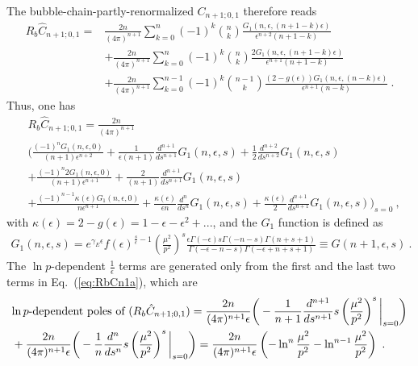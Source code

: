 \documentclass[a4paper,11pt]{article}
\begin{document}
The bubble-chain-partly-renormalized $C_{n+1;0,1}$ therefore reads
\begin{align} \label{eq:RbCn1a}
R_{b}\hat C_{n+1;0,1}=&\frac{2n}{(4\pi)^{n+1}}\sum_{k=0}^n(-1)^k\binom{n}{k}\frac{G_1(n,\epsilon,(n+1-k)\epsilon)}{\epsilon^{n+2}(n+1-k)} \nonumber \\
&+\frac{2n}{(4\pi)^{n+1}}\sum_{k=0}^n(-1)^k\binom{n}{k}\frac{2G_1(n,\epsilon,(n+1-k)\epsilon)}{\epsilon^{n+1}(n+1-k)}\nonumber \\
&+\frac{2n}{(4\pi)^{n+1}}\sum_{k=0}^{n-1}(-1)^k\binom{n-1}{k}\frac{(2-g(\epsilon))G_1(n,\epsilon,(n-k)\epsilon)}{\epsilon^{n+1}(n-k)} \ .
\end{align}
Thus, one has
\begin{align}
&R_b\hat C_{n+1;0,1}=\frac{2n}{(4\pi)^{n+1}}\nonumber \\ 
&\bigg(\frac{(-1)^nG_1(n,\epsilon,0)}{(n+1)\epsilon^{n+2}}+\frac{1}{\epsilon(n+1)}\frac{d^{n+1}}{ds^{n+1}}G_1(n,\epsilon,s)+\frac{1}{2}\frac{d^{n+2}}{ds^{n+2}}G_1(n,\epsilon,s)\nonumber \\ 
&+\frac{(-1)^n2G_1(n,\epsilon,0)}{(n+1)\epsilon^{n+1}}+\frac{2}{(n+1)}\frac{d^{n+1}}{ds^{n+1}}G_1(n,\epsilon,s)\nonumber \\ 
&+\frac{(-1)^{n-1}\kappa(\epsilon)G_1(n,\epsilon,0)}{n\epsilon^{n+1}}+\frac{\kappa(\epsilon)}{\epsilon n}\frac{d^{n}}{ds^{n}}G_1(n,\epsilon,s)+\frac{\kappa(\epsilon)}{2}\frac{d^{n+1}}{ds^{n+1}}G_1(n,\epsilon,s)\bigg)_{s=0} \ , 
\end{align}
with $\kappa(\epsilon)=2-g(\epsilon)=1-\epsilon-\epsilon^2+...$, and the $G_1$ function is defined as 
\begin{align}
G_1(n,\epsilon,s)=e^{\gamma_E\epsilon}f(\epsilon)^{\frac{s}{\epsilon}-1}\left(\frac{\mu^2}{p^2}\right)^s\frac{\epsilon\Gamma (-\epsilon)  s\Gamma (-n-s) \Gamma (n+s+1)}{\Gamma (-\epsilon-n-s) \Gamma (-\epsilon+n+s+1)}\equiv G(n+1,\epsilon,s) \ .
\end{align}
The $\ln p$-dependent $\frac{1}{\epsilon}$ terms are generated only from the first and the last two terms in Eq.~(\ref{eq:RbCn1a}), which are
\begin{align}
&\text{\rm $\ln p$-dependent poles of }(R_b\hat C_{n+1;0,1})=\frac{2n}{(4\pi)^{n+1}\epsilon}\bigg(-\frac{1}{n+1}\frac{d^{n+1}}{ds^{n+1}}s\left(\frac{\mu^2}{p^2}\right)^s\bigg|_{s=0}\bigg) \nonumber \\
&+\frac{2n}{(4\pi)^{n+1}\epsilon}\bigg(-\frac{1}{n}\frac{d^{n}}{ds^{n}}s\left(\frac{\mu^2}{p^2}\right)^s\bigg|_{s=0}\bigg) =\frac{2n}{(4\pi)^{n+1}\epsilon}\left(-\ln^{n}\frac{\mu^2}{p^2}-\ln^{n-1}\frac{\mu^2}{p^2}\right)\ .
\end{align}
\end{document}
